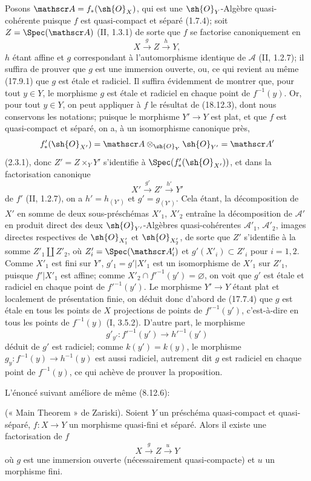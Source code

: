 Posons $\mathscr A=f_*(\sh{O}_X)$, qui est une $\sh{O}_Y$-Algèbre quasi-cohérente puisque $f$ est quasi-compact et séparé (1.7.4); soit $Z=\Spec(\mathscr A)$ (II, 1.3.1) de sorte que $f$ se factorise canoniquement en
\[
  X\xrightarrow{g}Z\xrightarrow{h}Y,
\]
$h$ étant affine et $g$ correspondant à l'automorphisme identique de $\mathscr A$ (II, 1.2.7); il suffira de prouver que $g$ est une immersion ouverte, ou, ce qui revient au même (17.9.1) que $g$ est étale et radiciel. Il suffira évidemment de montrer que, pour tout $y\in Y$, le morphisme $g$ est étale et radiciel en chaque point de $f^{-1}(y)$. Or, pour tout $y\in Y$, on peut appliquer à $f$ le résultat de (18.12.3), dont nous conservons les notations; puisque le morphisme $Y'\to Y$ est plat, et que $f$ est quasi-compact et séparé, on a, à un isomorphisme canonique près,
\[
  f'_*(\sh{O}_{X'})=\mathscr A\otimes_{\sh{O}_Y}\sh{O}_{Y'}=\mathscr A'
\]
(2.3.1), donc $Z'=Z\times_Y Y'$ s'identifie à $\Spec(f'_*(\sh{O}_{X'}))$, et dans la factorisation canonique
\[
  X'\xrightarrow{g'}Z'\xrightarrow{h'}Y'
\]
de $f'$ (II, 1.2.7), on a $h'=h_{(Y')}$ et $g'=g_{(Y')}$. Cela étant, la décomposition de $X'$ en somme de deux sous-préschémas $X'_1$, $X'_2$ entraîne la décomposition de $\mathscr A'$ en produit direct des deux $\sh{O}_{Y'}$-Algèbres quasi-cohérentes $\mathscr A'_1$, $\mathscr A'_2$, images directes respectives de $\sh{O}_{X'_1}$ et $\sh{O}_{X'_2}$, de sorte que $Z'$ s'identifie à la somme $Z'_1\amalg Z'_2$, où $Z'_i=\Spec(\mathscr A'_i)$ et $g'(X'_i)\subset Z'_i$ pour $i=1,2$. Comme $X'_1$ est fini sur $Y'$, $g'_1=g'|X'_1$ est un isomorphisme de $X'_1$ sur $Z'_1$, puisque $f'|X'_1$ est affine; comme $X'_2\cap f'^{-1}(y')=\varnothing$, on voit que $g'$ est étale et radiciel en chaque point de $f'^{-1}(y')$. Le morphisme $Y'\to Y$ étant plat et localement de présentation finie, on déduit donc d'abord de (17.7.4) que $g$ est étale en tous les points de $X$ projections de points de $f'^{-1}(y')$, c'est-à-dire en tous les points de $f^{-1}(y)$ (I, 3.5.2). D'autre part, le morphisme
\[
  g'_{y'}:f'^{-1}(y')\longrightarrow h'^{-1}(y')
\]
déduit de $g'$ est radiciel; comme $k(y')=k(y)$, le morphisme $g_y:f^{-1}(y)\to h^{-1}(y)$ est aussi radiciel, autrement dit $g$ est radiciel en chaque point de $f^{-1}(y)$, ce qui achève de prouver la proposition.

L'énoncé suivant améliore de même (8.12.6):

\begin{corollary}[18.12.13]
\label{IV.18.12.13}
(« Main Theorem » de Zariski). Soient $Y$ un préschéma quasi-compact et quasi-séparé, $f:X\to Y$ un morphisme quasi-fini et séparé. Alors il existe une factorisation de $f$
\[
  X\xrightarrow{g}Z\xrightarrow{u}Y
\]
où $g$ est une immersion ouverte (nécessairement quasi-compacte) et $u$ un morphisme fini.
\end{corollary}

